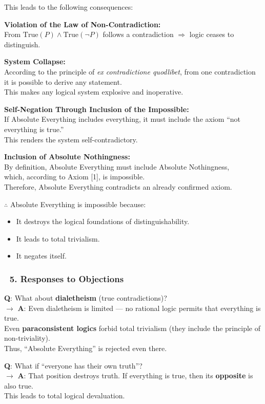 \documentclass[12pt]{article}
\begin{document}
This leads to the following consequences:

\textbf{Violation of the Law of Non-Contradiction:}\\
From $\text{True}(P) \wedge \text{True}(\neg P)$ follows a contradiction $\Rightarrow$ logic ceases to distinguish.

\textbf{System Collapse:}\\
According to the principle of \emph{ex contradictione quodlibet}, from one contradiction it is possible to derive any statement.\\
This makes any logical system explosive and inoperative.

\textbf{Self-Negation Through Inclusion of the Impossible:}\\
If Absolute Everything includes everything, it must include the axiom ``not everything is true.''\\
This renders the system self-contradictory.

\textbf{Inclusion of Absolute Nothingness:}\\
By definition, Absolute Everything must include Absolute Nothingness,\\
which, according to Axiom [1], is impossible.\\
Therefore, Absolute Everything contradicts an already confirmed axiom.

\noindent $\therefore$ Absolute Everything is impossible because:
\begin{itemize}
\item It destroys the logical foundations of distinguishability.
\item It leads to total trivialism.
\item It negates itself.
\end{itemize}

\subsubsection*{🔹 5. Responses to Objections}
\textbf{Q}: What about \textbf{dialetheism} (true contradictions)?\\
$\rightarrow$ \textbf{A}: Even dialetheism is limited — no rational logic permits that everything is true.\\
Even \textbf{paraconsistent logics} forbid total trivialism (they include the principle of non-triviality).\\
Thus, ``Absolute Everything'' is rejected even there.

\textbf{Q}: What if ``everyone has their own truth''?\\
$\rightarrow$ \textbf{A}: That position destroys truth. If everything is true, then its \textbf{opposite} is also true.\\
This leads to total logical devaluation.
\end{document}
